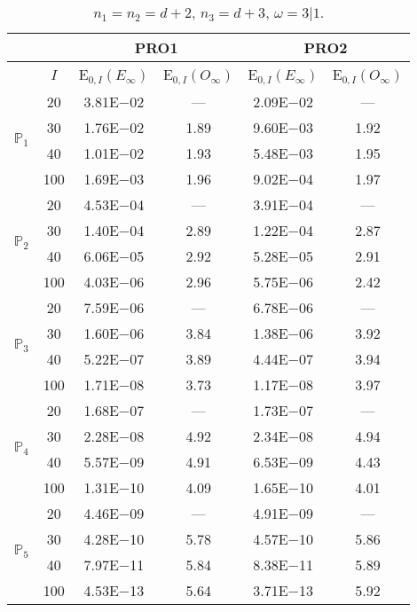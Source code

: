 \begin{table}[H]
\caption{$n_1=n_2=d+2$, $n_3=d+3$, $\omega=3|1$.}
\setlength{\tabcolsep}{5pt}
\centering
\begin{tabular}{@{}l c c c c c@{}}
\toprule
 &  & \multicolumn{2}{c}{PRO1} & \multicolumn{2}{c}{PRO2}\\
\midrule
 & $I$ & E$_{0,I}(E_{\infty})$ & E$_{0,I}(O_{\infty})$ & E$_{0,I}(E_{\infty})$ & E$_{0,I}(O_{\infty})$\\
\midrule
\multirow{4}{*}{$\mathbb{P}_{1}$}
 & 20 & 3.81E$-$02 & --- & 2.09E$-$02 & ---\\
 & 30 & 1.76E$-$02 & 1.89 & 9.60E$-$03 & 1.92 \\
 & 40 & 1.01E$-$02 & 1.93 & 5.48E$-$03 & 1.95 \\
 & 100 & 1.69E$-$03 & 1.96 & 9.02E$-$04 & 1.97 \\
\midrule
\multirow{4}{*}{$\mathbb{P}_{2}$}
 & 20 & 4.53E$-$04 & --- & 3.91E$-$04 & ---\\
 & 30 & 1.40E$-$04 & 2.89 & 1.22E$-$04 & 2.87 \\
 & 40 & 6.06E$-$05 & 2.92 & 5.28E$-$05 & 2.91 \\
 & 100 & 4.03E$-$06 & 2.96 & 5.75E$-$06 & 2.42 \\
\midrule
\multirow{4}{*}{$\mathbb{P}_{3}$}
 & 20 & 7.59E$-$06 & --- & 6.78E$-$06 & ---\\
 & 30 & 1.60E$-$06 & 3.84 & 1.38E$-$06 & 3.92 \\
 & 40 & 5.22E$-$07 & 3.89 & 4.44E$-$07 & 3.94 \\
 & 100 & 1.71E$-$08 & 3.73 & 1.17E$-$08 & 3.97 \\
\midrule
\multirow{4}{*}{$\mathbb{P}_{4}$}
 & 20 & 1.68E$-$07 & --- & 1.73E$-$07 & ---\\
 & 30 & 2.28E$-$08 & 4.92 & 2.34E$-$08 & 4.94 \\
 & 40 & 5.57E$-$09 & 4.91 & 6.53E$-$09 & 4.43 \\
 & 100 & 1.31E$-$10 & 4.09 & 1.65E$-$10 & 4.01 \\
\midrule
\multirow{4}{*}{$\mathbb{P}_{5}$}
 & 20 & 4.46E$-$09 & --- & 4.91E$-$09 & ---\\
 & 30 & 4.28E$-$10 & 5.78 & 4.57E$-$10 & 5.86 \\
 & 40 & 7.97E$-$11 & 5.84 & 8.38E$-$11 & 5.89 \\
 & 100 & 4.53E$-$13 & 5.64 & 3.71E$-$13 & 5.92 \\
\bottomrule
\end{tabular}
\label{Table:PRO:Rodrigo:Test16}
\end{table}
